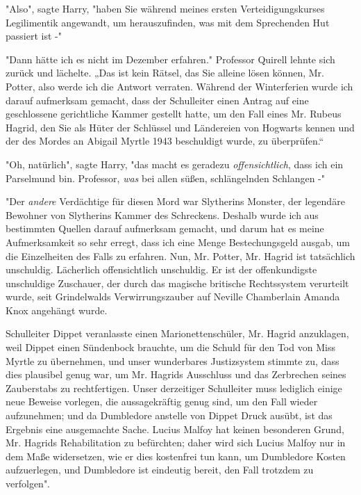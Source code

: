 {"Also", sagte Harry, "haben Sie während meines ersten Verteidigungskurses Legilimentik angewandt, um herauszufinden, was mit dem Sprechenden Hut passiert ist -"

"Dann hätte ich es nicht im Dezember erfahren." Professor Quirell lehnte sich zurück und lächelte. „Das ist kein Rätsel, das Sie alleine lösen können, Mr. Potter, also werde ich die Antwort verraten. Während der Winterferien wurde ich darauf aufmerksam gemacht, dass der Schulleiter einen Antrag auf eine geschlossene gerichtliche Kammer gestellt hatte, um den Fall eines Mr. Rubeus Hagrid, den Sie als Hüter der Schlüssel und Ländereien von Hogwarts kennen und der des Mordes an Abigail Myrtle 1943 beschuldigt wurde, zu überprüfen.“

"Oh, natürlich", sagte Harry, "das macht es geradezu \emph{offensichtlich}, dass ich ein Parselmund bin. Professor, \emph{was} bei allen süßen, schlängelnden Schlangen -"

"Der \emph{andere} Verdächtige für diesen Mord war Slytherins Monster, der legendäre Bewohner von Slytherins Kammer des Schreckens. Deshalb wurde ich aus bestimmten Quellen darauf aufmerksam gemacht, und darum hat es meine Aufmerksamkeit so sehr erregt, dass ich eine Menge Bestechungsgeld ausgab, um die Einzelheiten des Falls zu erfahren. Nun, Mr. Potter, Mr. Hagrid ist tatsächlich unschuldig. Lächerlich offensichtlich unschuldig. Er ist der offenkundigste unschuldige Zuschauer, der durch das magische britische Rechtssystem verurteilt wurde, seit Grindelwalds Verwirrungszauber auf Neville Chamberlain Amanda Knox angehängt wurde.

Schulleiter Dippet veranlasste einen Marionettenschüler, Mr. Hagrid anzuklagen, weil Dippet einen Sündenbock brauchte, um die Schuld für den Tod von Miss Myrtle zu übernehmen, und unser wunderbares Justizsystem stimmte zu, dass dies plausibel genug war, um Mr. Hagrids Ausschluss und das Zerbrechen seines Zauberstabs zu rechtfertigen. Unser derzeitiger Schulleiter muss lediglich einige neue Beweise vorlegen, die aussagekräftig genug sind, um den Fall wieder aufzunehmen; und da Dumbledore anstelle von Dippet Druck ausübt, ist das Ergebnis eine ausgemachte Sache. Lucius Malfoy hat keinen besonderen Grund, Mr. Hagrids Rehabilitation zu befürchten; daher wird sich Lucius Malfoy nur in dem Maße widersetzen, wie er dies kostenfrei tun kann, um Dumbledore Kosten aufzuerlegen, und Dumbledore ist eindeutig bereit, den Fall trotzdem zu verfolgen".

}
